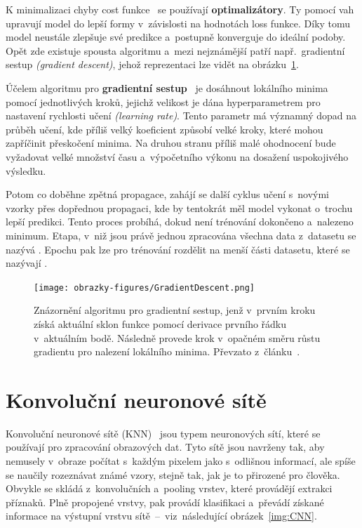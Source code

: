 K minimalizaci chyby cost funkce~\cite{website:NNForBeginnersByBeginner} se používají \textbf{optimalizátory}. Ty pomocí vah upravují model do lepší formy v~závislosti na hodnotách loss funkce. Díky tomu model neustále zlepšuje své predikce a~postupně konverguje do ideální podoby. Opět zde existuje spousta algoritmu a~mezi nejznámější patří např.~gradientní sestup \emph{(gradient descent)}, jehož reprezentaci lze vidět na obrázku~\ref{img:GradientDescent}.

Účelem algoritmu pro \textbf{gradientní sestup}~\cite{website:NNForBeginnersByBeginner} je dosáhnout lokálního minima pomocí jednotlivých kroků, jejichž velikost je dána hyperparametrem pro nastavení rychlosti učení \emph{(learning rate)}. Tento parametr má významný dopad na průběh učení, kde příliš velký koeficient způsobí velké kroky, které mohou zapříčinit přeskočení minima. Na druhou stranu příliš malé ohodnocení bude vyžadovat velké množství času a~výpočetního výkonu na dosažení uspokojivého výsledku.

Potom co doběhne zpětná propagace, zahájí se další cyklus učení s~novými vzorky přes dopřednou propagaci, kde by tentokrát měl model vykonat o~trochu lepší predikci. Tento proces probíhá, dokud není trénování dokončeno a~nalezeno minimum. Etapa, v~niž jsou právě jednou zpracována všechna data z~datasetu se nazývá . Epochu pak lze pro trénování rozdělit na menší části datasetu, které se nazývají \emph{}.

\begin{figure}[hbt]
	\centering
	\setlength{\fboxsep}{0pt}
	\texttt{[image: obrazky-figures/GradientDescent.png]}
	\caption{Znázornění algoritmu pro gradientní sestup, jenž v~prvním kroku získá aktuální sklon funkce pomocí derivace prvního řádku v~aktuálním bodě. Následně provede krok v~opačném směru růstu gradientu pro nalezení lokálního minima. Převzato z~článku~\cite{website:NNForBeginnersByBeginner}.}
	\label{img:GradientDescent}
\end{figure}

\section{Konvoluční neuronové sítě}
Konvoluční neuronové sítě (KNN)~\cite{website:CNNOverviewAndApplication} jsou typem neuronových sítí, které se používají pro zpracování obrazových dat. Tyto sítě jsou navrženy tak, aby nemusely v~obraze počítat s~každým pixelem jako s~odlišnou informací, ale spíše se naučily rozeznávat známé vzory, stejně tak, jak je to přirozené pro člověka. Obvykle se skládá z~konvolučních a~pooling vrstev, které provádějí extrakci příznaků. Plně propojené vrstvy, pak provádí klasifikaci a~převádí získané informace na výstupní vrstvu sítě~--~viz~následující obrázek~\ref{img:CNN}.

